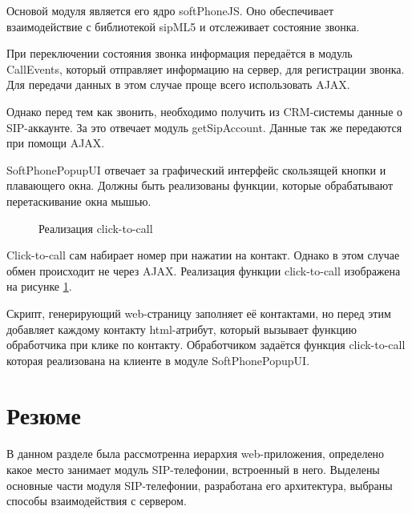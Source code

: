 Основой модуля является его ядро softPhoneJS. Оно обеспечивает взаимодействие с библиотекой sipML5 и отслеживает состояние звонка.

При переключении состояния звонка информация передаётся в модуль CallEvents, который отправляет информацию на сервер, для регистрации звонка. Для передачи данных в этом случае проще всего использовать AJAX.

Однако перед тем как звонить, необходимо получить из CRM-системы данные о SIP-аккаунте. За это отвечает модуль getSipAccount. Данные так же передаются при помощи AJAX.

SoftPhonePopupUI отвечает за графический интерфейс скользящей кнопки и плавающего окна. Должны быть реализованы функции, которые обрабатывают перетаскивание окна мышью.

\begin{figure}[h!]
\caption{Реализация click-to-call}
\label{image:ClickToCall}
\end{figure}

Click-to-call сам набирает номер при нажатии на контакт. Однако в этом случае обмен происходит не через AJAX. Реализация функции click-to-call изображена на рисунке \ref{image:ClickToCall}.

Скрипт, генерирующий web-страницу заполняет её контактами, но перед этим добавляет каждому контакту html-атрибут, который вызывает функцию обработчика при клике по контакту. Обработчиком задаётся функция click-to-call которая реализована на клиенте в модуле SoftPhonePopupUI.

\section{Резюме}

В данном разделе была рассмотренна иерархия web-приложения, определено какое место занимает модуль SIP-телефонии, встроенный в него. Выделены основные части модуля SIP-телефонии, разработана его архитектура, выбраны способы взаимодействия с сервером.
